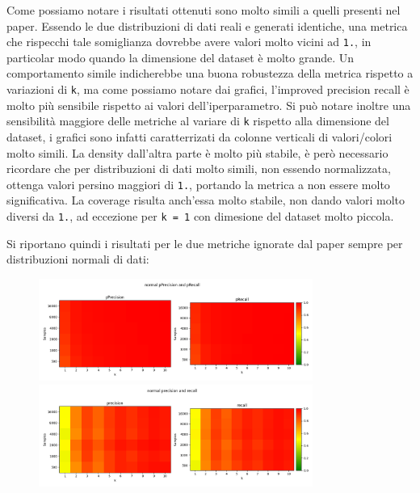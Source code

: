 Come possiamo notare i risultati ottenuti sono molto simili a quelli presenti nel paper. Essendo le due distribuzioni di dati reali e generati identiche, una metrica che rispecchi tale somiglianza dovrebbe avere valori molto vicini ad \texttt{1.}, in particolar modo quando la dimensione del dataset è molto grande.
Un comportamento simile indicherebbe una buona robustezza della metrica rispetto a variazioni di \texttt{k}, ma come possiamo notare dai grafici, l'improved precision recall è molto più sensibile rispetto ai valori dell'iperparametro. 
Si può notare inoltre una sensibilità maggiore delle metriche al variare di \texttt{k} rispetto alla dimensione del dataset, i grafici sono infatti caratterrizati da colonne verticali di valori/colori molto simili.
La density dall'altra parte è molto più stabile, è però necessario ricordare che per distribuzioni di dati molto simili, non essendo normalizzata, ottenga valori persino maggiori di \texttt{1.}, portando la metrica a non essere molto significativa.
La coverage risulta anch'essa molto stabile, non dando valori molto diversi da \texttt{1.}, ad eccezione per \texttt{k = 1} con dimesione del dataset molto piccola.

Si riportano quindi i risultati per le due metriche ignorate dal paper sempre per distribuzioni normali di dati:

\begin{figure}[!ht]
    \centering
    \includegraphics[width=0.8\textwidth]{../images/toyexperiments/kdim/normal_pPrecision_pRecall.png} 
    \includegraphics[width=0.8\textwidth]{../images/toyexperiments/kdim/normal_precision_recall.png} 
\end{figure}

